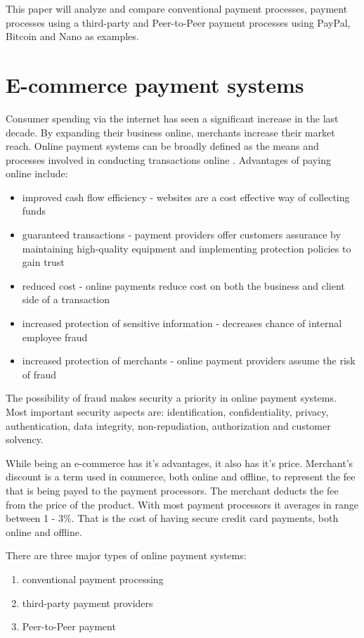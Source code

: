 \documentclass{ferseminar}
\begin{document}
This paper will analyze and compare conventional payment processes, payment processes using a third-party and Peer-to-Peer payment processes using PayPal, Bitcoin and Nano as examples.


\section{E-commerce payment systems}

Consumer spending via the internet has seen a significant increase in the last decade. By expanding their business online, merchants increase their market reach. Online payment systems can be broadly defined as the means and processes involved in conducting transactions online \cite{Lowry}. Advantages of paying online include:
\begin{itemize}
	\item improved cash flow efficiency - websites are a cost effective way of collecting funds
	\item guaranteed transactions - payment providers offer customers assurance by maintaining high-quality equipment and implementing protection policies to gain trust
	\item reduced cost - online payments reduce cost on both the business and client side of a transaction
	\item increased protection of sensitive information - decreases chance of internal employee fraud
	\item increased protection of merchants - online payment providers assume the risk of fraud
\end{itemize}

The possibility of fraud makes security a priority in online payment systems. Most important security aspects are: identification, confidentiality, privacy, authentication, data integrity, non-repudiation, authorization and customer solvency.

While being an e-commerce has it's advantages, it also has it's price. Merchant's discount is a term used in commerce, both online and offline, to represent the fee that is being payed to the payment processors. The merchant deducts the fee from the price of the product. With most payment processors it averages in range between 1 - 3\%. That is the cost of having secure credit card payments, both online and offline. 

There are three major types of online payment systems:
\begin{enumerate}
	\item conventional payment processing
	\item third-party payment providers
	\item Peer-to-Peer payment
\end{enumerate}
\end{document}
